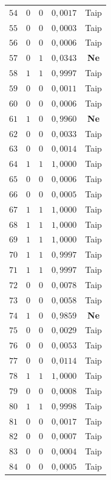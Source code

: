 \begin{longtable}{ccccc}
    $54$ & $0$ & $0$ & $0{,}0017$ & Taip \\
    $55$ & $0$ & $0$ & $0{,}0003$ & Taip \\
    $56$ & $0$ & $0$ & $0{,}0006$ & Taip \\
    $57$ & $0$ & $1$ & $0{,}0343$ & \textbf{Ne} \\
    $58$ & $1$ & $1$ & $0{,}9997$ & Taip \\
    $59$ & $0$ & $0$ & $0{,}0011$ & Taip \\
    $60$ & $0$ & $0$ & $0{,}0006$ & Taip \\
    $61$ & $1$ & $0$ & $0{,}9960$ & \textbf{Ne} \\
    $62$ & $0$ & $0$ & $0{,}0033$ & Taip \\
    $63$ & $0$ & $0$ & $0{,}0014$ & Taip \\
    $64$ & $1$ & $1$ & $1{,}0000$ & Taip \\
    $65$ & $0$ & $0$ & $0{,}0006$ & Taip \\
    $66$ & $0$ & $0$ & $0{,}0005$ & Taip \\
    $67$ & $1$ & $1$ & $1{,}0000$ & Taip \\
    $68$ & $1$ & $1$ & $1{,}0000$ & Taip \\
    $69$ & $1$ & $1$ & $1{,}0000$ & Taip \\
    $70$ & $1$ & $1$ & $0{,}9997$ & Taip \\
    $71$ & $1$ & $1$ & $0{,}9997$ & Taip \\
    $72$ & $0$ & $0$ & $0{,}0078$ & Taip \\
    $73$ & $0$ & $0$ & $0{,}0058$ & Taip \\
    $74$ & $1$ & $0$ & $0{,}9859$ & \textbf{Ne} \\
    $75$ & $0$ & $0$ & $0{,}0029$ & Taip \\
    $76$ & $0$ & $0$ & $0{,}0053$ & Taip \\
    $77$ & $0$ & $0$ & $0{,}0114$ & Taip \\
    $78$ & $1$ & $1$ & $1{,}0000$ & Taip \\
    $79$ & $0$ & $0$ & $0{,}0008$ & Taip \\
    $80$ & $1$ & $1$ & $0{,}9998$ & Taip \\
    $81$ & $0$ & $0$ & $0{,}0017$ & Taip \\
    $82$ & $0$ & $0$ & $0{,}0007$ & Taip \\
    $83$ & $0$ & $0$ & $0{,}0004$ & Taip \\
    $84$ & $0$ & $0$ & $0{,}0005$ & Taip \\

\end{longtable}
